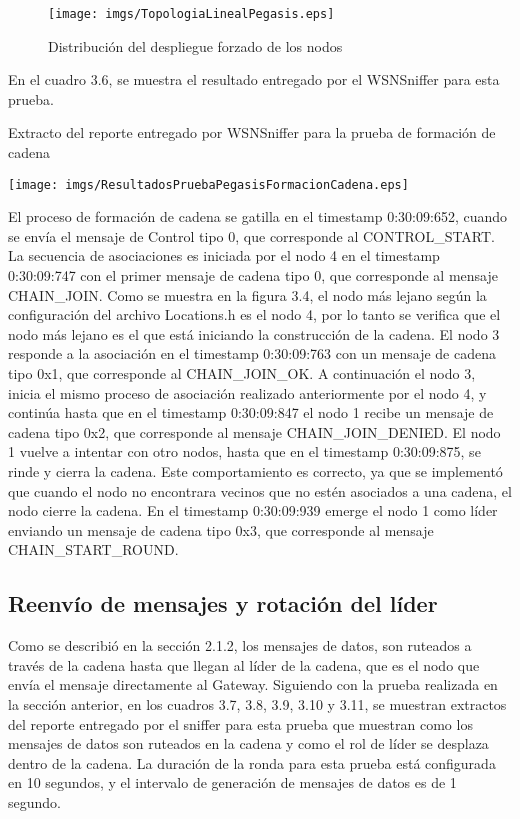 \begin{figure}[H]
  \centering
 \texttt{[image: imgs/TopologiaLinealPegasis.eps]}
 \caption{Distribución del despliegue forzado de los nodos}
\end{figure}

En el cuadro 3.6, se muestra el resultado entregado por el WSNSniffer para esta prueba.

\begin{table}[H]
  \centering
  \caption{Extracto del reporte entregado por WSNSniffer para la prueba de formación de cadena }
 \texttt{[image: imgs/ResultadosPruebaPegasisFormacionCadena.eps]}
\end{table}

El proceso de formación de cadena se gatilla en el timestamp 0:30:09:652, cuando se envía el mensaje de Control tipo 0, que corresponde al CONTROL\_START. La secuencia de asociaciones es iniciada por el nodo 4 en el timestamp 0:30:09:747 con el primer mensaje de cadena tipo 0, que corresponde al mensaje CHAIN\_JOIN. Como se muestra en la figura 3.4, el nodo más lejano según la configuración del archivo Locations.h es el nodo 4, por lo tanto se verifica que el nodo más lejano es el que está iniciando la construcción de la cadena. El nodo 3 responde a la asociación en el timestamp 0:30:09:763 con un mensaje de cadena tipo 0x1, que corresponde al CHAIN\_JOIN\_OK. A continuación el nodo 3, inicia el mismo proceso de asociación realizado anteriormente por el nodo 4, y continúa hasta que en el timestamp 0:30:09:847 el nodo 1 recibe un mensaje de cadena tipo 0x2, que corresponde al mensaje CHAIN\_JOIN\_DENIED. El nodo 1 vuelve a intentar con otro nodos, hasta que en el timestamp 0:30:09:875, se rinde y cierra la cadena. Este comportamiento es correcto, ya que se implementó que cuando el nodo no encontrara vecinos que no estén asociados a una cadena, el nodo cierre la cadena. En el timestamp 0:30:09:939 emerge el nodo 1 como líder enviando un mensaje de cadena tipo 0x3, que corresponde al mensaje CHAIN\_START\_ROUND.

\subsection{Reenvío de mensajes y rotación del líder}
Como se describió en la sección 2.1.2, los mensajes de datos, son ruteados a través de la cadena hasta que llegan al líder de la cadena, que es el nodo que envía el mensaje directamente al Gateway. Siguiendo con la prueba realizada en la sección anterior, en los cuadros 3.7, 3.8, 3.9, 3.10 y 3.11, se muestran extractos del reporte entregado por el sniffer para esta prueba que muestran como los mensajes de datos son ruteados en la cadena y como el rol de líder se desplaza dentro de la cadena. La duración de la ronda para esta prueba está configurada en 10 segundos, y el intervalo de generación de mensajes de datos es de 1 segundo.


